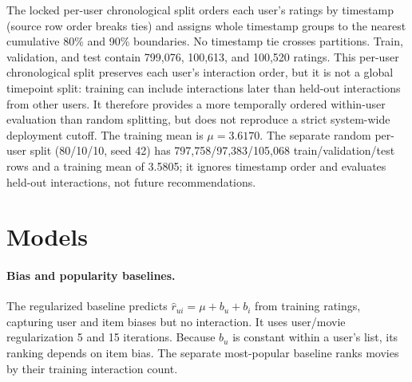 \documentclass{article}
\begin{document}
The locked per-user chronological split orders each user's ratings by
timestamp (source row order breaks ties) and assigns whole timestamp groups
to the nearest cumulative 80\% and 90\% boundaries. No timestamp tie crosses
partitions. Train, validation, and test contain 799,076, 100,613, and
100,520 ratings. This per-user chronological split preserves each user's
interaction order, but it is not a global timepoint split: training can
include interactions later than held-out interactions from other users. It
therefore provides a more temporally ordered within-user evaluation than
random splitting, but does not reproduce a strict system-wide deployment
cutoff. The training mean is $\mu=3.6170$. The separate random per-user
split (80/10/10, seed 42) has 797,758/97,383/105,068
train/validation/test rows and a training mean of 3.5805; it ignores
timestamp order and evaluates held-out interactions, not future
recommendations.

\section{Models}
\paragraph{Bias and popularity baselines.}
The regularized baseline predicts $\hat r_{ui}=\mu+b_u+b_i$ from training
ratings, capturing user and item biases but no interaction. It uses user/movie
regularization 5 and 15 iterations. Because $b_u$ is constant within a user's
list, its ranking depends on item bias. The separate most-popular baseline
ranks movies by their training interaction count.
\end{document}
